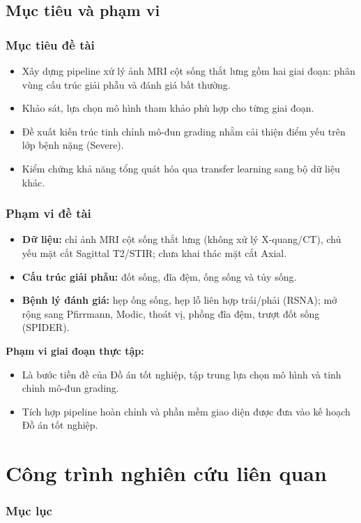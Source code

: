 \documentclass{beamer}
\numberwithin{figure}{section}
\numberwithin{table}{section}
\begin{document}
\subsection{Mục tiêu và phạm vi}
\begin{frame}
\frametitle{Mục tiêu đề tài}
\begin{itemize}
    \item[--] Xây dựng pipeline xử lý ảnh MRI cột sống thắt lưng gồm hai giai đoạn: phân vùng cấu trúc giải phẫu và đánh giá bất thường.
    \item[--] Khảo sát, lựa chọn mô hình tham khảo phù hợp cho từng giai đoạn.
    \item[--] Đề xuất kiến trúc tinh chỉnh mô-đun grading nhằm cải thiện điểm yếu trên lớp bệnh nặng (Severe).
    \item[--] Kiểm chứng khả năng tổng quát hóa qua transfer learning sang bộ dữ liệu khác.
\end{itemize}
\end{frame}

\begin{frame}
\frametitle{Phạm vi đề tài}
\begin{itemize}
    \item[--] \textbf{Dữ liệu:} chỉ ảnh MRI cột sống thắt lưng (không xử lý X-quang/CT), chủ yếu mặt cắt Sagittal T2/STIR; chưa khai thác mặt cắt Axial.
    \item[--] \textbf{Cấu trúc giải phẫu:} đốt sống, đĩa đệm, ống sống và tủy sống.
    \item[--] \textbf{Bệnh lý đánh giá:} hẹp ống sống, hẹp lỗ liên hợp trái/phải (RSNA); mở rộng sang Pfirrmann, Modic, thoát vị, phồng đĩa đệm, trượt đốt sống (SPIDER).
\end{itemize}
\pause
\textbf{Phạm vi giai đoạn thực tập:}
\begin{itemize}
    \item[--] Là bước tiền đề của Đồ án tốt nghiệp, tập trung lựa chọn mô hình và tinh chỉnh mô-đun grading.
    \item[$\rightarrow$] Tích hợp pipeline hoàn chỉnh và phần mềm giao diện được đưa vào kế hoạch Đồ án tốt nghiệp.
\end{itemize}
\end{frame}

\section{Công trình nghiên cứu liên quan}
{
    \begin{frame}
        \frametitle{Mục lục}
    \end{frame}
}
\end{document}
